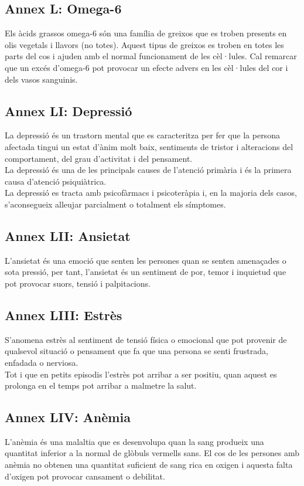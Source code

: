 \documentclass[a4paper,12pt]{article}
\begin{document}
\subsection*{Annex L: Omega-6}
Els àcids grassos omega-6 són una família de greixos que es troben presents en olis vegetals i llavors (no totes). Aquest tipus de greixos es troben en totes les parts del cos i ajuden amb el normal funcionament de les cèl·lules. Cal remarcar que un excés d'omega-6 pot provocar un efecte advers en les cèl·lules del cor i dels vasos sanguinis.
\subsection*{Annex LI: Depressió}
La depressió és un trastorn mental que es caracteritza per fer que la persona afectada tingui un estat d'ànim molt baix, sentiments de tristor i alteracions del comportament, del grau d'activitat i del pensament.\\
La depressió és una de les principals causes de l'atenció primària i és la primera causa d'atenció psiquiàtrica.\\
La depressió es tracta amb psicofàrmacs i psicoteràpia i, en la majoria dels casos, s'aconsegueix alleujar parcialment o totalment els símptomes.
\subsection*{Annex LII: Ansietat}
L'ansietat és una emoció que senten les persones quan se senten amenaçades o sota pressió, per tant, l'ansietat és un sentiment de por, temor i inquietud que pot provocar suors, tensió i palpitacions.
\subsection*{Annex LIII: Estrès}
S'anomena estrès al sentiment de tensió física o emocional que pot provenir de qualsevol situació o pensament que fa que una persona se senti frustrada, enfadada o nerviosa.\\
Tot i que en petits episodis l'estrès pot arribar a ser positiu, quan aquest es prolonga en el temps pot arribar a malmetre la salut.
\subsection*{Annex LIV: Anèmia}
L'anèmia és una malaltia que es desenvolupa quan la sang produeix una quantitat inferior a la normal de glòbuls vermells sans. El cos de les persones amb anèmia no obtenen una quantitat suficient de sang rica en oxigen i aquesta falta d'oxigen pot provocar cansament o debilitat.
\end{document}
